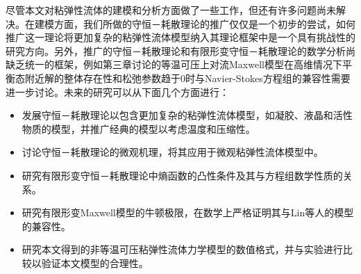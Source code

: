 尽管本文对粘弹性流体的建模和分析方面做了一些工作，但还有许多问题尚未解决。在建模方面，我们所做的守恒－耗散理论的推广仅仅是一个初步的尝试，如何推广这一理论将更加复杂的粘弹性流体模型纳入其理论框架中是一个具有挑战性的研究方向。另外，推广的守恒－耗散理论和有限形变守恒－耗散理论的数学分析尚缺乏统一的框架，例如第三章讨论的等温可压上对流Maxwell模型在高维情况下平衡态附近解的整体存在性和松弛参数趋于$0$时与Navier-Stokes方程组的兼容性需要进一步讨论。未来的研究可以从下面几个方面进行：
\begin{itemize}
	\item 发展守恒－耗散理论以包含更加复杂的粘弹性流体模型，如凝胶、液晶和活性物质的模型，并推广经典的模型以考虑温度和压缩性。
	\item 讨论守恒－耗散理论的微观机理，将其应用于微观粘弹性流体模型中。
	\item 研究有限形变守恒－耗散理论中熵函数的凸性条件及其与方程组数学性质的关系。
	\item 研究有限形变Maxwell模型的牛顿极限，在数学上严格证明其与Lin等人的模型的兼容性。	
	\item 研究本文得到的非等温可压粘弹性流体力学模型的数值格式，并与实验进行比较以验证本文模型的合理性。
\end{itemize}

% 